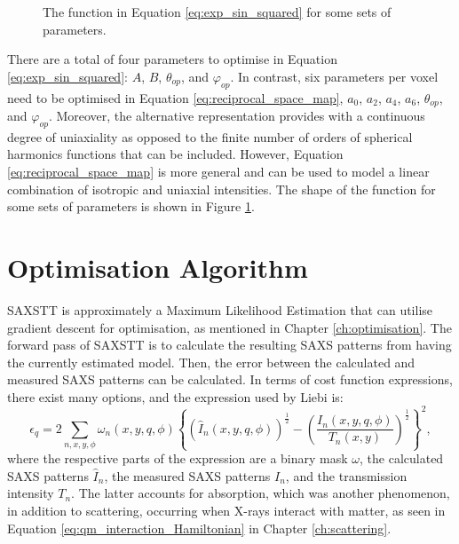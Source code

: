 \begin{figure}
    \centering
    
    \caption{The function in Equation \eqref{eq:exp_sin_squared} for some sets of parameters.}
    \label{fig:exp_sin_squared}
\end{figure}

There are a total of four parameters to optimise in Equation \eqref{eq:exp_sin_squared}: $A$, $B$, $\theta_{op}$, and $\varphi_{op}$.
In contrast, six parameters per voxel need to be optimised in Equation \eqref{eq:reciprocal_space_map},
$a_{0}$, $a_{2}$, $a_{4}$, $a_{6}$, $\theta_{op}$, and $\varphi_{op}$.
Moreover, the alternative representation provides with a continuous degree of uniaxiality
as opposed to the finite number of orders of spherical harmonics functions that can be included.
However, Equation \eqref{eq:reciprocal_space_map} is more general and can be used to model a linear combination of isotropic and uniaxial intensities.
The shape of the function for some sets of parameters is shown in Figure \ref{fig:exp_sin_squared}.


\section{Optimisation Algorithm}

SAXSTT is approximately a Maximum Likelihood Estimation that can utilise gradient descent for optimisation, as mentioned in Chapter \ref{ch:optimisation}.
The forward pass of SAXSTT is to calculate the resulting SAXS patterns from having the currently estimated model.
Then, the error between the calculated and measured SAXS patterns can be calculated.
In terms of cost function expressions, there exist many options, and the expression used by Liebi \cite{liebi2018small} is:
\begin{equation}
    \epsilon_{q} = 2 \sum_{n, x, y, \phi} \omega_{n}(x,y,q,\phi) \left\{ \left( \widehat{I}_{n}(x,y,q,\phi) \right)^{\frac{1}{2}}  -  \left( \frac{ I_{n}(x,y,q,\phi) }{T_{n}(x,y)} \right)^{\frac{1}{2}} \right\}^{2},
\end{equation}
\noindent
where the respective parts of the expression are a binary mask $\omega$, the calculated SAXS patterns $\widehat{I}_{n}$, the measured SAXS patterns $I_{n}$, and the transmission intensity $T_{n}$.
The latter accounts for absorption, which was another phenomenon, in addition to scattering, occurring when X-rays interact with matter,
as seen in Equation \eqref{eq:qm_interaction_Hamiltonian} in Chapter \ref{ch:scattering}.

